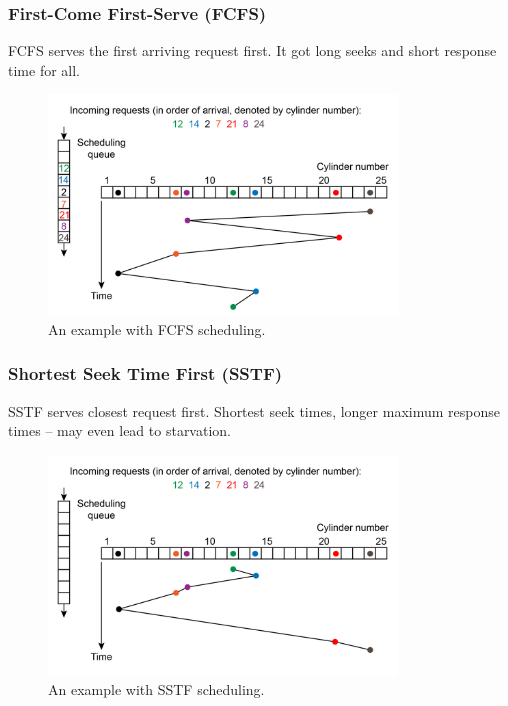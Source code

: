 \documentclass[11pt,a4paper]{article}
\begin{document}
\subsubsection{First-Come First-Serve (FCFS)}
FCFS serves the first arriving request first. It got long seeks and short response time for all.
\begin{figure}[h!]
	\centering
		\includegraphics[width=350px]{img/fcfs-01.png}
	\caption{An example with FCFS scheduling.}
\end{figure}

\subsubsection{Shortest Seek Time First (SSTF)}
SSTF serves closest request first. Shortest seek times, longer maximum response times -- may even lead to starvation.
\begin{figure}[h!]
	\centering
		\includegraphics[width=350px]{img/sstf-01.png}
	\caption{An example with SSTF scheduling.}
\end{figure}
\end{document}

